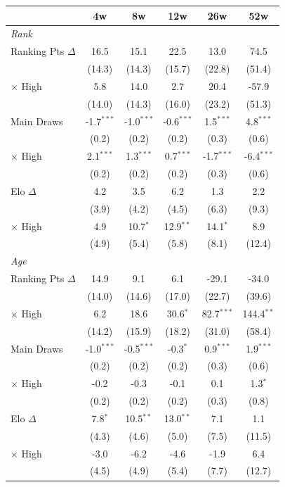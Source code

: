 \begin{tabular}{l*{5}{c}}
\toprule
 & 4w & 8w & 12w & 26w & 52w \\
\midrule
\multicolumn{6}{l}{\textit{Rank}} \\
  Ranking Pts $\Delta$ & 16.5 & 15.1 & 22.5 & 13.0 & 74.5 \\
  & (14.3) & (14.3) & (15.7) & (22.8) & (51.4) \\
  $\times$ High & 5.8 & 14.0 & 2.7 & 20.4 & -57.9 \\
  & (14.0) & (14.3) & (16.0) & (23.2) & (51.3) \\[0.3em]
  Main Draws & -1.7$^{***}$ & -1.0$^{***}$ & -0.6$^{***}$ & 1.5$^{***}$ & 4.8$^{***}$ \\
  & (0.2) & (0.2) & (0.2) & (0.3) & (0.6) \\
  $\times$ High & 2.1$^{***}$ & 1.3$^{***}$ & 0.7$^{***}$ & -1.7$^{***}$ & -6.4$^{***}$ \\
  & (0.2) & (0.2) & (0.2) & (0.3) & (0.6) \\[0.3em]
  Elo $\Delta$ & 4.2 & 3.5 & 6.2 & 1.3 & 2.2 \\
  & (3.9) & (4.2) & (4.5) & (6.3) & (9.3) \\
  $\times$ High & 4.9 & 10.7$^{*}$ & 12.9$^{**}$ & 14.1$^{*}$ & 8.9 \\
  & (4.9) & (5.4) & (5.8) & (8.1) & (12.4) \\[0.3em]
\midrule
\multicolumn{6}{l}{\textit{Age}} \\
  Ranking Pts $\Delta$ & 14.9 & 9.1 & 6.1 & -29.1 & -34.0 \\
  & (14.0) & (14.6) & (17.0) & (22.7) & (39.6) \\
  $\times$ High & 6.2 & 18.6 & 30.6$^{*}$ & 82.7$^{***}$ & 144.4$^{**}$ \\
  & (14.2) & (15.9) & (18.2) & (31.0) & (58.4) \\[0.3em]
  Main Draws & -1.0$^{***}$ & -0.5$^{***}$ & -0.3$^{*}$ & 0.9$^{***}$ & 1.9$^{***}$ \\
  & (0.2) & (0.2) & (0.2) & (0.3) & (0.6) \\
  $\times$ High & -0.2 & -0.3 & -0.1 & 0.1 & 1.3$^{*}$ \\
  & (0.2) & (0.2) & (0.2) & (0.3) & (0.8) \\[0.3em]
  Elo $\Delta$ & 7.8$^{*}$ & 10.5$^{**}$ & 13.0$^{**}$ & 7.1 & 1.1 \\
  & (4.3) & (4.6) & (5.0) & (7.5) & (11.5) \\
  $\times$ High & -3.0 & -6.2 & -4.6 & -1.9 & 6.4 \\
  & (4.5) & (4.9) & (5.4) & (7.7) & (12.7) \\[0.3em]
\midrule
\bottomrule
\end{tabular}
